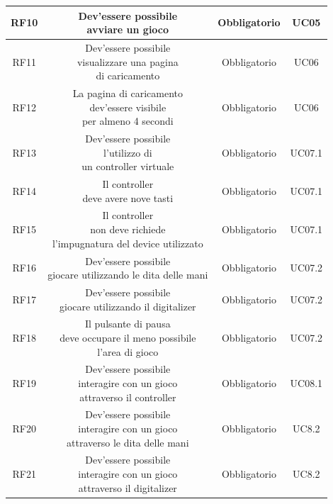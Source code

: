\begin{longtable}{|c|c|c|c|}
    \hline
    RF10&\makecell{Dev'essere possibile \\ avviare un gioco}&Obbligatorio&UC05\\
    \hline
    RF11&\makecell{Dev'essere possibile \\ visualizzare una pagina \\ di caricamento}&Obbligatorio&UC06\\
    \hline
    RF12&\makecell{La pagina di caricamento \\ dev'essere visibile \\ per almeno 4 secondi}&Obbligatorio&UC06\\
    \hline
    RF13&\makecell{Dev'essere possibile \\ l'utilizzo di \\ un controller virtuale}&Obbligatorio&UC07.1\\
    \hline
    RF14&\makecell{Il controller \\ deve avere nove tasti}&Obbligatorio&UC07.1\\
    \hline
    RF15&\makecell{Il controller \\ non deve richiede \\ l'impugnatura del device utilizzato}&Obbligatorio&UC07.1\\
    \hline
    RF16&\makecell{Dev'essere possibile \\ giocare utilizzando le dita delle mani}&Obbligatorio&UC07.2\\
    \hline
    RF17&\makecell{Dev'essere possibile \\ giocare utilizzando il digitalizer}&Obbligatorio&UC07.2\\
    \hline
    RF18&\makecell{Il pulsante di pausa \\ deve occupare il meno possibile \\ l'area di gioco}&Obbligatorio&UC07.2\\
    \hline
    RF19&\makecell{Dev'essere possibile \\ interagire con un gioco \\ attraverso il controller}&Obbligatorio&UC08.1\\
    \hline
    RF20&\makecell{Dev'essere possibile \\ interagire con un gioco \\ attraverso le dita delle mani}&Obbligatorio&UC8.2\\
    \hline
    RF21&\makecell{Dev'essere possibile \\ interagire con un gioco \\ attraverso il digitalizer}&Obbligatorio&UC8.2\\

\end{longtable}
